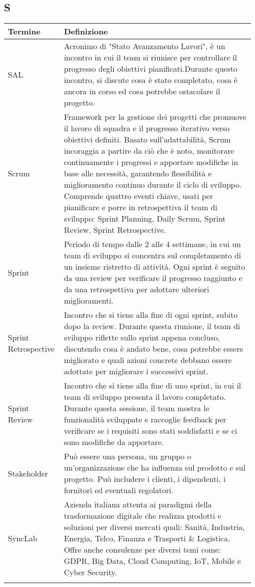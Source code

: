 \documentclass[10pt]{article}
\begin{document}
\subsection{S} %
\begin{tabularx}{\textwidth}{|>{\centering\arraybackslash}l|X|}
\hline
\rowcolor[gray]{0.8}
\textbf{Termine} & \textbf{Definizione}\\
\hline
SAL & Acronimo di "Stato Avanzamento Lavori", è un incontro in cui il team si riunisce per controllare il progresso degli obiettivi pianificati.\newline Durante questo incontro, si discute cosa è stato completato, cosa è ancora in corso ed cosa potrebbe ostacolare il progetto.\\
\hline
Scrum & Framework per la gestione dei progetti che promuove il lavoro di squadra e il progresso iterativo verso obiettivi definiti. Basato sull'adattabilità, Scrum incoraggia a partire da ciò che è noto, monitorare continuamente i progressi e apportare modifiche in base alle necessità, garantendo flessibilità e miglioramento continuo durante il ciclo di sviluppo. Comprende quattro eventi chiave, usati per pianificare e porre in retrospettiva il team di sviluppo: Sprint Planning, Daily Scrum, Sprint Review, Sprint Retrospective.\\
\hline
Sprint & Periodo di tempo dalle 2 alle 4 settimane, in cui un team di sviluppo si concentra sul completamento di un insieme ristretto di attività. Ogni sprint è seguito da una review per verificare il progresso raggiunto e da una retrospettiva per adottare ulteriori miglioramenti.\\
\hline
Sprint Retrospective & Incontro che si tiene alla fine di ogni sprint, subito dopo la review. Durante questa riunione, il team di sviluppo riflette sullo sprint appena concluso, discutendo cosa è andato bene, cosa potrebbe essere migliorato e quali azioni concrete debbano essere adottate per migliorare i successivi sprint.\\
\hline
Sprint Review & Incontro che si tiene alla fine di uno sprint, in cui il team di sviluppo presenta il lavoro completato. Durante questa sessione, il team mostra le funzionalità sviluppate e raccoglie feedback per verificare se i requisiti sono stati soddisfatti e se ci sono modifiche da apportare.\\
\hline
Stakeholder & Può essere una persona, un gruppo o un'organizzazione che ha influenza sul prodotto e sul progetto. Può includere i clienti, i dipendenti, i fornitori ed eventuali regolatori.\\
\hline
SyncLab & Azienda italiana attenta ai paradigmi della trasformazione digitale che realizza prodotti e soluzioni per diversi mercati quali: Sanità, Industria, Energia, Telco, Finanza e Trasporti \& Logistica. Offre anche consulenze per diversi temi come: GDPR, Big Data, Cloud Computing, IoT, Mobile e Cyber Security.\\
\hline
 & \\
\hline
\end{tabularx}
\end{document}
